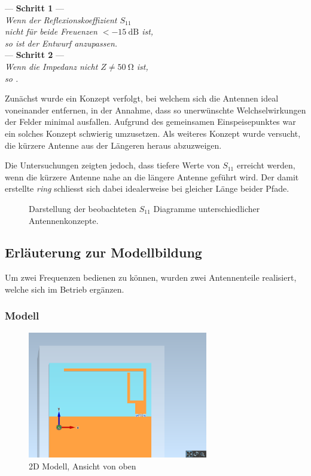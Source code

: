 \begin{center}
	--- \textbf{Schritt 1} --- \\
	\emph{
		Wenn der Reflexionskoeffizient $S_{11}$ \\
		nicht für beide Freuenzen $< \SI{-15}{\dB}$ ist, \\
		so ist der Entwurf anzupassen.} \\
	--- \textbf{Schritt 2} --- \\
	\emph{
		Wenn die Impedanz nicht $Z \neq \SI{50}{\ohm}$ ist, \\
		so .} \\
\end{center}

Zunächst wurde ein Konzept verfolgt, bei welchem sich die Antennen
ideal voneinander entfernen, in der Annahme, dass so unerwünschte
Welchselwirkungen der Felder minimal ausfallen. Aufgrund des gemeinsamen
Einspeisepunktes war ein solches Konzept schwierig umzusetzen. Als weiteres
Konzept wurde versucht, die kürzere Antenne aus der Längeren heraus
abzuzweigen.

Die Untersuchungen zeigten jedoch, dass tiefere Werte von $S_{11}$
erreicht werden, wenn die kürzere Antenne nahe an die längere Antenne
geführt wird. Der damit erstellte \emph{ring} schliesst sich dabei
idealerweise bei gleicher Länge beider Pfade.

\begin{figure}[h!]
	\centering
	\footnotesize
	\def\svgscale{0.75}
	
	\caption{Darstellung der beobachteten $S_{11}$ Diagramme unterschiedlicher Antennenkonzepte.}
	\label{fig:antenna_concept_1}
\end{figure}


\subsection{Erläuterung zur Modellbildung}
Um zwei Frequenzen bedienen zu können, wurden zwei Antennenteile realisiert, welche sich im Betrieb ergänzen.

\subsubsection{Modell}

\begin{figure}[h!]
	\centering
	\includegraphics[width=0.7\textwidth]{../fig/plt/crazy_stuff_l4_pcb_v2c_laptop_1a_105_5ghz_3d_pcb_xy.png}
	\caption{2D Modell, Ansicht von oben}
\end{figure}

